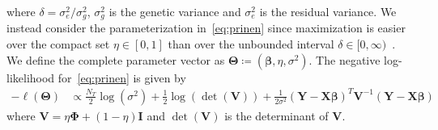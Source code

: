 \documentclass[12pt,letter]{article}\usepackage[]{graphicx}\usepackage[]{color}
\newcommand{\bX}{\textbf{X}}
\newcommand{\bY}{\textbf{Y}}
\newcommand{\bV}{\textbf{V}}
\newcommand{\bI}{\textbf{I}}
\newcommand{\bTheta}{\boldsymbol{\Theta}}
\newcommand{\bbeta}{\boldsymbol{\beta}}
\newcommand{\bPhi}{\boldsymbol{\Phi}}
\begin{document}
where $\delta = \sigma^2_e / \sigma^2_g$, $\sigma^2_g$ is the genetic variance and $\sigma^2_e$ is the residual variance. We instead consider the parameterization in~\eqref{eq:prinen} since maximization is easier over the compact set $\eta \in [0,1]$ than over the unbounded interval $\delta \in [0, \infty)$~\citep{pirinen2013efficient}. We define the complete parameter vector as $\bTheta \coloneqq \left(\bbeta, \eta, \sigma^2 \right)$. The negative log-likelihood for~\eqref{eq:prinen} is given by
\begin{align}
	-\ell(\bTheta) & \propto \frac{N_T}{2}\log(\sigma^2) + \frac{1}{2}\log\left(\det(\bV)\right) + \frac{1}{2\sigma^2} \left(\bY - \bX \bbeta\right)^T \bV^{-1} \left(\bY - \bX \bbeta\right)  \label{eq:LogLike}
\end{align}
where $\bV = \eta \bPhi + (1-\eta) \bI$ and $\det(\bV)$ is the determinant of $\bV$. 
\end{document}
